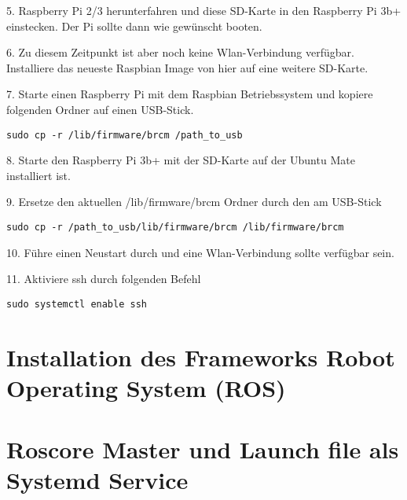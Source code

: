 5. Raspberry Pi 2/3 herunterfahren und diese SD-Karte in den Raspberry Pi 3b+ einstecken. Der Pi sollte dann wie gewünscht booten. 

6. Zu diesem Zeitpunkt ist aber noch keine Wlan-Verbindung verfügbar. Installiere das neueste Raspbian Image von hier auf eine weitere SD-Karte. 

7. Starte einen Raspberry Pi mit dem Raspbian Betriebssystem und kopiere folgenden Ordner auf einen USB-Stick. 

\begin{lstlisting}
sudo cp -r /lib/firmware/brcm /path_to_usb
\end{lstlisting}

8. Starte den Raspberry Pi 3b+ mit der SD-Karte auf der Ubuntu Mate installiert ist. 

9. Ersetze den aktuellen /lib/firmware/brcm Ordner durch den am USB-Stick

\begin{lstlisting}
sudo cp -r /path_to_usb/lib/firmware/brcm /lib/firmware/brcm
\end{lstlisting}

10. Führe einen Neustart durch und eine Wlan-Verbindung sollte verfügbar sein.

11. Aktiviere ssh durch folgenden Befehl

\begin{lstlisting}
sudo systemctl enable ssh
\end{lstlisting}


\section{Installation des Frameworks Robot Operating System (ROS)}





\section{Roscore Master und Launch file als Systemd Service}